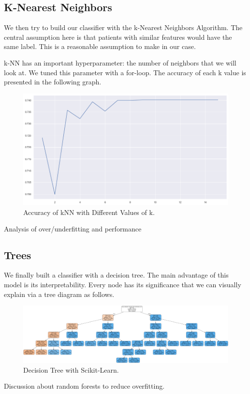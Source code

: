 \documentclass[a4paper]{article}
\begin{document}
\subsection*{K-Nearest Neighbors}
We then try to build our classifier with the k-Nearest Neighbors Algorithm. The central assumption here is that patients with similar features would have the same label. This is a reasonable assumption to make in our case.\par
k-NN has an important hyperparameter: the number of neighbors that we will look at. We tuned this parameter with a for-loop. The accuracy of each k value is presented in the following graph.
\begin{figure}[H]
\centering
\includegraphics[scale=0.265]{knn.png}
\caption{Accuracy of kNN with Different Values of k.}
\label{COnfirmed Cases}
\end{figure}
Analysis of over/underfitting and performance
\subsection*{Trees}
We finally built a classifier with a decision tree. The main advantage of this model is its interpretability. Every node has its significance that we can visually explain via a tree diagram as follows.\par
\begin{figure}[H]
\centering
\includegraphics[scale=0.1]{tree.png}
\caption{Decision Tree with Scikit-Learn.}
\label{COnfirmed Cases}
\end{figure}
Discussion about random forests to reduce overfitting.
\end{document}
